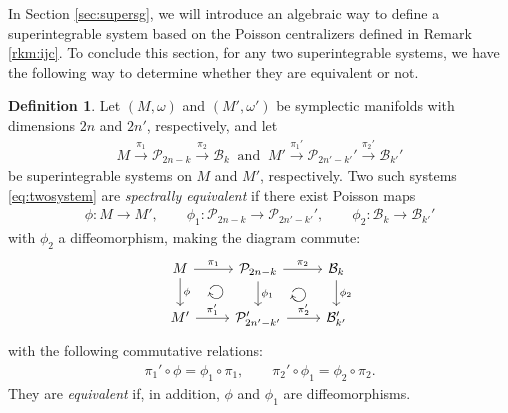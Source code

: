 \documentclass[11pt,reqno]{amsart}
\newtheorem*{theorem A}{Main Theorem A}
\newtheorem*{theorem B}{Main Theorem B}
\newtheorem*{theorem C}{Main Theorem C}
\newtheorem*{theorem D}{Main Theorem D}
\theoremstyle{definition}
\newtheorem{definition}[theorem]{Definition}
\theoremstyle{plain}
\theoremstyle{conclusion}
\begin{document}
 In Section \ref{sec:supersg}, we will introduce an algebraic way to define a superintegrable system based on the Poisson centralizers defined in Remark \ref{rkm:ijc}.  To conclude this section,  for any two superintegrable systems, we have the following way to determine whether they are equivalent or not. 

\begin{definition} \cite{MR3493688}
\label{def:equidefi}
 Let $(M,\omega)$ and $(M',\omega')$ be symplectic manifolds with dimensions $2n$ and $2n'$, respectively, %
 and let \begin{align}
M \xrightarrow{\ \pi_1\ } \mathcal{P}_{2n-k}\xrightarrow{\ \pi_2\ } \mathcal{B}_k \  \text{ and } \  M' \xrightarrow{\pi_1'} \mathcal{P}_{2n'-k'}' \xrightarrow{\pi_2'} \mathcal{B}_{k'}' \label{eq:twosystem}
\end{align} be superintegrable systems on $M$ and $M'$, respectively. Two such systems \eqref{eq:twosystem} are \textit{spectrally equivalent} if there exist Poisson maps \begin{align*}
\phi:M \rightarrow  M',\qquad \phi_1:\mathcal{P}_{2n-k}\rightarrow  \mathcal{P}_{2n'-k'}',\qquad \phi_2:\mathcal{B}_k \rightarrow  \mathcal{B}_{k'}'
\end{align*} with $\phi_2$ a diffeomorphism, making the diagram commute:  \[\begin{tikzcd}
	M & {\mathcal{P}_{2n-k}} & {\mathcal{B}_k} \\
	{M'} & {\mathcal{P}_{2n'-k'}'} & {\mathcal{B}_{k'}'}
	\arrow["\pi_1", from=1-1, to=1-2]
	\arrow["{\phi}", from=1-1, to=2-1]
	\arrow["\pi_2", from=1-2, to=1-3]
	\arrow["{\phi_1}", from=1-2, to=2-2]
	\arrow["{\phi_2}", from=1-3, to=2-3]
	\arrow["{\pi_1'}", from=2-1, to=2-2]
	\arrow["{\pi_2'}", from=2-2, to=2-3]
    \arrow[from=1-1, to=2-2, phantom, "\circlearrowright" {anchor=center, scale=1.5, rotate=90}]
    \arrow[from=1-2, to=2-3, phantom, "\circlearrowright" {anchor=center, scale=1.5, rotate=90}]
\end{tikzcd}\] 
with the following commutative relations:
\begin{align*}
\pi_1'\circ \phi=\phi_1\circ \pi_1,\qquad \pi_2'\circ \phi_1=\phi_2\circ \pi_2.
\end{align*} They are \textit{equivalent} if, in addition, $\phi$ and $\phi_1$ are diffeomorphisms. 
\end{definition}
\end{document}
